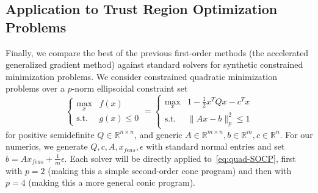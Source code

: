 \documentclass[sn-mathphys,Numbered]{sn-jnl}%
\begin{document}


\subsection{Application to Trust Region Optimization Problems}\label{subsec:numerics2}
Finally, we compare the best of the previous first-order methods (the accelerated generalized gradient method) against standard solvers for synthetic constrained minimization problems. We consider constrained quadratic minimization problems over a $p$-norm ellipsoidal constraint set
\begin{equation} \label{eq:quad-SOCP}
    \begin{cases} \max_x & f(x) \\ \text{s.t. } & g(x) \leq 0
    \end{cases}=
    \begin{cases} \max_x &  1-\frac{1}{2}x^TQx -c^Tx  \\ \text{s.t. } & \|Ax-b\|^2_p\leq 1   \end{cases}
\end{equation}
for positive semidefinite $Q\in\mathbb{R}^{n\times n}$, and generic $A\in\mathbb{R}^{m\times n}, b\in\mathbb{R}^m, c\in\mathbb{R}^n$. For our numerics, we generate $Q, c, A, x_{feas}, \epsilon$ with standard normal entries and set $b=Ax_{feas}+\frac{1}{m} \epsilon$.
Each solver will be directly applied to~\eqref{eq:quad-SOCP}, first with $p=2$ (making this a simple second-order cone program) and then with $p=4$ (making this a more general conic program). 
\end{document}
